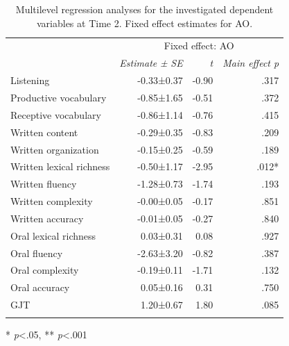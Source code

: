 \documentclass[output=paper,modfonts,nonflat,newtxmath]{langsci/langscibook}
\begin{document}
\begin{table}
\caption{\label{tab:pfenninger:7} Multilevel regression analyses for the investigated dependent variables at Time 2. Fixed effect estimates for AO.}

\begin{tabularx}{0.83\textwidth}{l rrr}
\lsptoprule
& \multicolumn{3}{c}{ Fixed effect: AO}\\
\cmidrule{2-4}
 & \textit{Estimate} \textit{±} \textit{SE} & \textit{t}  & \textit{Main effect p}\\
\cmidrule{1-4}
Listening  & -0.33±0.37 & -0.90 & .317\\
Productive vocabulary & -0.85±1.65 & -0.51 & .372 \\
 Receptive vocabulary & -0.86±1.14 & -0.76 & .415\\
Written content & -0.29±0.35 & -0.83 & .209\\
 Written organization & -0.15±0.25 & -0.59 & .189\\
 Written lexical richness & -0.50±1.17 & -2.95 & .012*\\
 Written fluency & -1.28±0.73 & -1.74 & .193\\
 Written complexity & -0.00±0.05 & -0.17 & .851\\
 Written accuracy & -0.01±0.05 & -0.27 & .840\\
 Oral lexical richness & 0.03±0.31 & 0.08 & .927\\
 Oral fluency & -2.63±3.20 & -0.82 & .387\\
 Oral complexity & -0.19±0.11 & -1.71 & .132\\
 Oral accuracy & 0.05±0.16 & 0.31 & .750\\
 GJT & 1.20±0.67 & 1.80 & .085\\
\lspbottomrule
\end{tabularx}

* \textit{p}<.05, ** \textit{p}<.001
\end{table}
\end{document}
